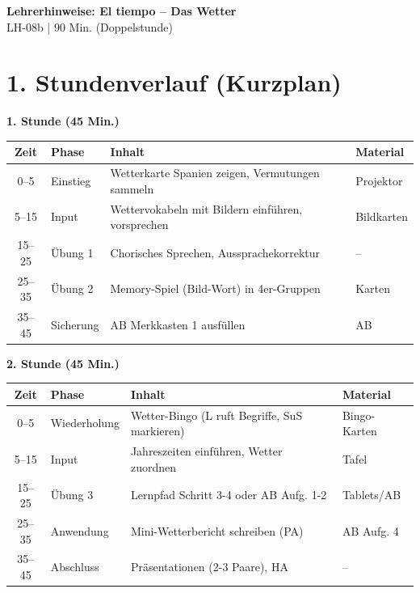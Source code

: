 \documentclass[11pt, a4paper]{article}
\newcommand{\fachfarbe}{spanisch}
\newcommand{\thema}{El tiempo -- Das Wetter}
\newcommand{\sequenz}{08}
\newcommand{\block}{b}
\newcommand{\dauer}{90 Min. (Doppelstunde)}
\begin{document}

\begin{center}
    {\Large\bfseries\textcolor{\fachfarbe}{Lehrerhinweise: \thema}}\\[0.3em]
    {\normalsize LH-\sequenz\block{} | \dauer}
\end{center}

\vspace{10pt}


\section*{1. Stundenverlauf (Kurzplan)}

\textbf{1. Stunde (45 Min.)}

\begin{tabularx}{\textwidth}{|c|l|X|l|}
\hline
\textbf{Zeit} & \textbf{Phase} & \textbf{Inhalt} & \textbf{Material} \\
\hline
0--5 & Einstieg & Wetterkarte Spanien zeigen, Vermutungen sammeln & Projektor \\
\hline
5--15 & Input & Wettervokabeln mit Bildern einführen, vorsprechen & Bildkarten \\
\hline
15--25 & Übung 1 & Chorisches Sprechen, Aussprachekorrektur & -- \\
\hline
25--35 & Übung 2 & Memory-Spiel (Bild-Wort) in 4er-Gruppen & Karten \\
\hline
35--45 & Sicherung & AB Merkkasten 1 ausfüllen & AB \\
\hline
\end{tabularx}

\vspace{1em}

\textbf{2. Stunde (45 Min.)}

\begin{tabularx}{\textwidth}{|c|l|X|l|}
\hline
\textbf{Zeit} & \textbf{Phase} & \textbf{Inhalt} & \textbf{Material} \\
\hline
0--5 & Wiederholung & Wetter-Bingo (L ruft Begriffe, SuS markieren) & Bingo-Karten \\
\hline
5--15 & Input & Jahreszeiten einführen, Wetter zuordnen & Tafel \\
\hline
15--25 & Übung 3 & Lernpfad Schritt 3-4 oder AB Aufg. 1-2 & Tablets/AB \\
\hline
25--35 & Anwendung & Mini-Wetterbericht schreiben (PA) & AB Aufg. 4 \\
\hline
35--45 & Abschluss & Präsentationen (2-3 Paare), HA & -- \\
\hline
\end{tabularx}
\end{document}
